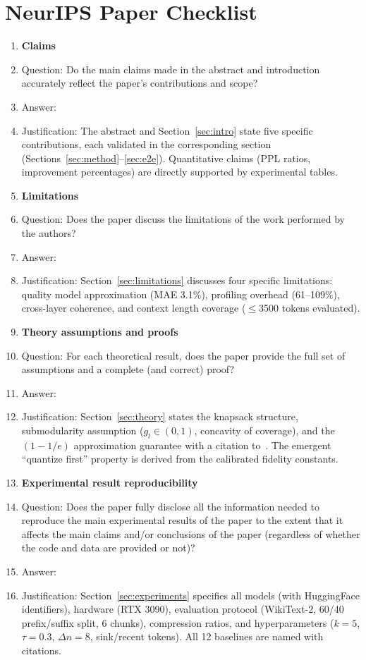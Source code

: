 \section*{NeurIPS Paper Checklist}

\begin{enumerate}

\item {\bf Claims}
    \item[] Question: Do the main claims made in the abstract and introduction accurately reflect the paper's contributions and scope?
    \item[] Answer: \answerYes{}
    \item[] Justification: The abstract and Section~\ref{sec:intro} state five specific contributions, each validated in the corresponding section (Sections~\ref{sec:method}--\ref{sec:e2e}). Quantitative claims (PPL ratios, improvement percentages) are directly supported by experimental tables.

\item {\bf Limitations}
    \item[] Question: Does the paper discuss the limitations of the work performed by the authors?
    \item[] Answer: \answerYes{}
    \item[] Justification: Section~\ref{sec:limitations} discusses four specific limitations: quality model approximation (MAE 3.1\%), profiling overhead (61--109\%), cross-layer coherence, and context length coverage ($\leq$3500 tokens evaluated).

\item {\bf Theory assumptions and proofs}
    \item[] Question: For each theoretical result, does the paper provide the full set of assumptions and a complete (and correct) proof?
    \item[] Answer: \answerYes{}
    \item[] Justification: Section~\ref{sec:theory} states the knapsack structure, submodularity assumption ($g_l \in (0,1)$, concavity of coverage), and the $(1-1/e)$ approximation guarantee with a citation to~\citet{sviridenko2004note}. The emergent ``quantize first'' property is derived from the calibrated fidelity constants.

    \item {\bf Experimental result reproducibility}
    \item[] Question: Does the paper fully disclose all the information needed to reproduce the main experimental results of the paper to the extent that it affects the main claims and/or conclusions of the paper (regardless of whether the code and data are provided or not)?
    \item[] Answer: \answerYes{}
    \item[] Justification: Section~\ref{sec:experiments} specifies all models (with HuggingFace identifiers), hardware (RTX 3090), evaluation protocol (WikiText-2, 60/40 prefix/suffix split, 6 chunks), compression ratios, and hyperparameters ($k=5$, $\tau=0.3$, $\Delta n=8$, sink/recent tokens). All 12 baselines are named with citations.


\end{enumerate}
